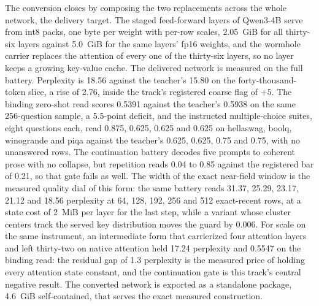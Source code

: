 \documentclass[11pt]{article}
\begin{document}
The conversion closes by composing the two replacements across
the whole network, the delivery target. The staged feed-forward
layers of Qwen3-4B serve from int8 packs, one byte per weight
with per-row scales, 2.05~GiB for all thirty-six layers against
5.0~GiB for the same layers' fp16 weights, and the wormhole
carrier replaces the attention of every one of the thirty-six
layers, so no layer keeps a growing key-value cache. The
delivered network is measured on the full battery. Perplexity is
18.56 against the teacher's 15.80 on the forty-thousand-token
slice, a rise of 2.76, inside the track's registered coarse flag
of $+5$. The binding zero-shot read scores 0.5391 against
the teacher's 0.5938 on the same 256-question sample, a
5.5-point deficit, and the instructed multiple-choice suites,
eight questions each, read 0.875, 0.625, 0.625 and 0.625 on
hellaswag, boolq, winogrande and piqa against the teacher's
0.625, 0.625, 0.75 and 0.75, with no unanswered rows. The
continuation battery decodes five prompts to coherent prose with
no collapse, but repetition reads 0.04 to 0.85 against the
registered bar of 0.21, so that gate fails as well. The width of
the exact near-field window is the measured quality dial of this
form: the same battery reads 31.37, 25.29, 23.17, 21.12 and
18.56 perplexity at 64, 128, 192, 256 and 512 exact-recent rows,
at a state cost of 2~MiB per layer for the last step, while a
variant whose cluster centers track the served key distribution
moves the guard by 0.006. For scale on the same instrument, an
intermediate form that carrierized four attention layers and
left thirty-two on native attention held 17.24 perplexity and
0.5547 on the binding read: the residual gap of 1.3 perplexity
is the measured price of holding every attention state
constant, and the continuation gate is this track's central
negative result. The converted network is exported
as a standalone package, 4.6~GiB self-contained, that serves the
exact measured construction.
\end{document}
